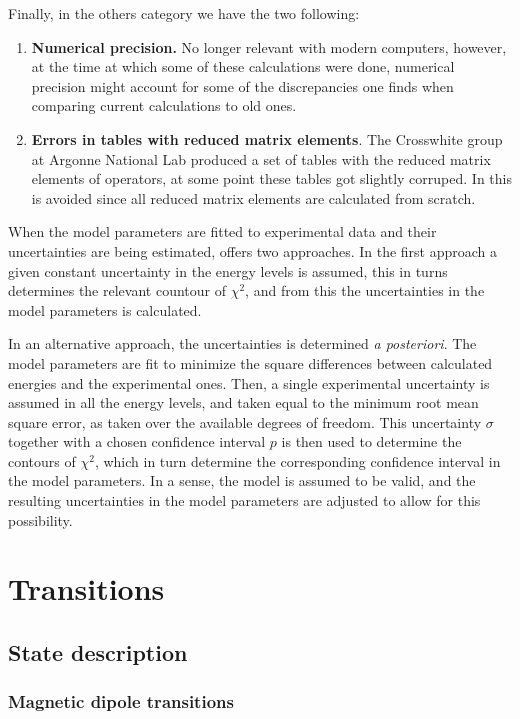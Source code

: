 \documentclass{article}
\begin{document}
Finally, in the others category we have the two following:

\begin{enumerate}
\item \textbf{Numerical precision.} No longer relevant with modern computers, however, at the time at which some of these calculations were done, numerical precision might account for some of the discrepancies one finds when comparing current calculations to old ones.
\item \textbf{Errors in tables with reduced matrix elements}. The Crosswhite group at Argonne National Lab produced a set of tables with the reduced matrix elements of operators, at some point these tables got slightly corruped. In \qlanth this is avoided since all reduced matrix elements are calculated from scratch.
\end{enumerate}

When the model parameters are fitted to experimental data and their uncertainties are being estimated, \qlanth offers two approaches. In the first approach a given constant uncertainty in the energy levels is assumed, this in turns determines the relevant countour of $\chi^2$, and from this the uncertainties in the model parameters is calculated.

In an alternative approach, the uncertainties is determined \textit{a posteriori}. The model parameters are fit to minimize the square differences between calculated energies and the experimental ones. Then, a single experimental uncertainty is assumed in all the energy levels, and taken equal to the minimum root mean  square error, as taken over the available degrees of freedom. This uncertainty $\sigma$ together with a chosen confidence interval $p$ is then used to determine the contours of $\chi^2$, which in turn determine the corresponding confidence interval in the model parameters. In a sense, the model is assumed to be valid, and the resulting uncertainties in the model parameters are adjusted to allow for this possibility.

\section{Transitions}

\subsection{State description}

\subsubsection{Magnetic dipole transitions}
\end{document}
